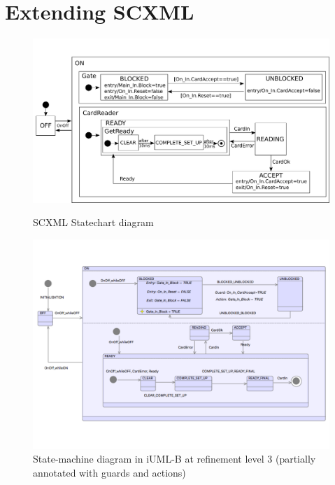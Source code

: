 
\section{Extending SCXML}
\label{sect:extension}

\begin{figure}
\begin{minipage}[]{.53\textwidth}
  \includegraphics[width=1\textwidth]{caseStudy/TurnstileSimpleModel_ManualChart}
  \caption{SCXML Statechart diagram}
  \label{fig:StatemachineSCXML}
\end{minipage}
\begin{minipage}[]{.53\textwidth}
  \includegraphics[width=1\textwidth]{caseStudy/TurnstileSimpleModel_iumlb}
  \caption{State-machine diagram in iUML-B at refinement level 3 (partially annotated with guards and actions)}
  \label{fig:StatemachineiUML-B}
\end{minipage}
\end{figure}

